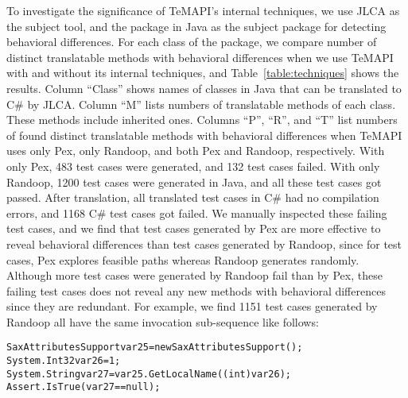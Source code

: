 To investigate the significance of TeMAPI's internal techniques, we use JLCA as the subject tool, and the  package in Java as the subject package for detecting behavioral differences. For each class of the package, we compare number of distinct translatable methods with behavioral differences when we use TeMAPI with and without its internal techniques, and Table~\ref{table:techniques} shows the results. Column ``Class'' shows names of classes in Java that can be translated to C\# by JLCA. Column ``M'' lists numbers of translatable methods of each class. These methods include inherited ones. Columns ``P'', ``R'', and ``T'' list numbers of found distinct translatable methods with behavioral differences when TeMAPI uses only Pex, only Randoop, and both Pex and Randoop, respectively. With only Pex, 483 test cases were generated, and 132 test cases failed. With only Randoop, 1200 test cases were generated in Java, and all these test cases got passed. After translation, all translated test cases in C\# had no compilation errors, and 1168 C\# test cases got failed. We manually inspected these failing test cases, and we find that test cases generated by Pex are more effective to reveal behavioral differences than test cases generated by Randoop, since for test cases, Pex explores feasible paths whereas Randoop generates randomly. Although more test cases were generated by Randoop fail than by Pex, these failing test cases does not reveal any new methods with behavioral differences since they are redundant. For example, we find 1151 test cases generated by Randoop all have the same invocation sub-sequence like follows:

\begin{CodeOut}\vspace*{-1.5ex}
\begin{alltt}
SaxAttributesSupport var25 = new SaxAttributesSupport();
System.Int32 var26 = 1;
System.String var27 = var25.GetLocalName((int) var26);
Assert.IsTrue(var27 == null);
\end{alltt}
\end{CodeOut}\vspace*{-1.5ex}


